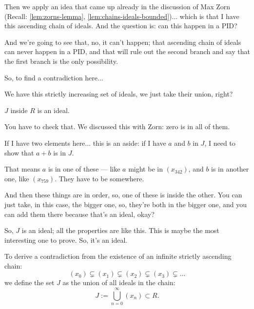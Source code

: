 \begin{proofWrapper}
\begin{speech}[01:09:39 - 01:12:09]

Then we apply an idea that came up already in the discussion of Max Zorn (Recall: \cref{lem:zorns-lemma}, \cref{lem:chains-ideals-bounded})... which is that I have this ascending chain of ideals. And the question is: can this happen in a PID?

And we're going to see that, no, it can't happen; that ascending chain of ideals can never happen in a PID, and that will rule out the second branch and say that the first branch is the only possibility.

So, to find a contradiction here... 

We have this strictly increasing set of ideals, we just take their union, right?

$J$ inside $R$ is an ideal. 

You have to check that. We discussed this with Zorn: zero is in all of them.

If I have two elements here... this is an aside:  if I have $a$ and $b$ in $J$, I need to show that $a + b$ is in $J$.

That means $a$ is in one of these --- like $a$ might be in $(x_{342})$,  and $b$ is in another one, like $(x_{759})$.  They have to be somewhere.

And then these things are in order, so, one of these is inside the other. You can just take, in this case, the bigger one, so, they're both in the bigger one, and you can add them there because that's an ideal, okay?

So, $J$ is an ideal; all the properties are like this. This is maybe the most interesting one to prove. So, it's an ideal.
\end{speech}

\begin{content}
To derive a contradiction from the existence of an infinite strictly ascending chain:
\[
(x_0) \subsetneq (x_1) \subsetneq (x_2) \subsetneq (x_3) \subsetneq \dots
\]
we define the set $J$ as the union of all ideals in the chain:
\begin{equation}\label{eq:part4-def-union-ideal-j}
J := \bigcup_{n=0}^\infty (x_n) \subset R.
\end{equation}


\end{content}
\end{proofWrapper}

